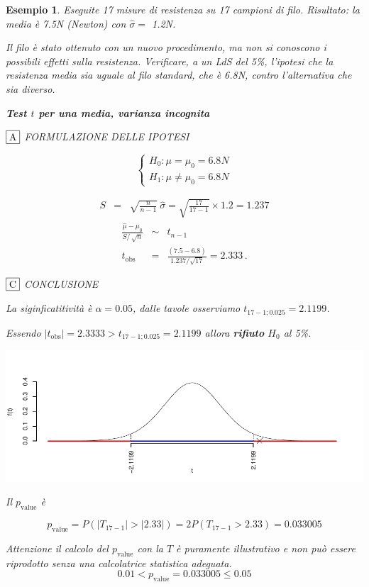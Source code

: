\documentclass[
  11pt,
]{book}
\theoremstyle{mytheoremstyle}
\theoremstyle{mydefstyle}
\newtheorem{example}{{Esempio}}[section]
\begin{document}
\begin{example}
Eseguite 17 misure di resistenza su 17 campioni di filo. Risultato: la
media è 7.5N (Newton) con \(\hat\sigma=\) 1.2N.

Il filo è stato ottenuto con un nuovo procedimento, ma non si conoscono
i possibili effetti sulla resistenza. Verificare, a un LdS del 5\%,
l'ipotesi che la resistenza media sia uguale al filo standard, che è
6.8N, contro l'alternativa che sia diverso.

\textbf{Test \(t\) per una media, varianza incognita}

\(\fbox{A}\) FORMULAZIONE DELLE IPOTESI

\[\begin{cases}
   H_0: \mu = \mu_0=6.8N \\
   H_1: \mu \neq \mu_0=6.8N 
   \end{cases}\]

\begin{eqnarray*}
   S    &=& \sqrt{\frac{n} {n-1}}\ \widehat{\sigma} 
   =  \sqrt{\frac{ 17 } { 17 -1}} \times  1.2  =  1.237 
   \end{eqnarray*}
\begin{eqnarray*}
   \frac{\hat\mu - \mu_{0}} {S/\,\sqrt{n}}&\sim&t_{n-1}\\
   t_{\text{obs}}
   &=& \frac{ ( 7.5 -  6.8 )} { 1.237 /\sqrt{ 17 }}
   =   2.333 \, .
   \end{eqnarray*}

\(\fbox{C}\) CONCLUSIONE

La siginficatitività è \(\alpha=0.05\), dalle tavole osserviamo \(t_{17-1;0.025}=2.1199\).

Essendo \(|t_\text{obs}|=2.3333>t_{17-1;0.025}=2.1199\) allora \textbf{rifiuto} \(H_0\) al 5\%.

\begin{center}\includegraphics{Appunti_di_Statistica_2025_files/figure-latex/15-test-mu-pi-7,-1} \end{center}

Il \(p_{\text{value}}\) è

\[ p_{\text{value}} = P(|T_{17-1}|>|2.33|)=2P(T_{17-1}>2.33)=0.033005 \]

Attenzione il calcolo del \(p_\text{value}\) con la \(T\) è puramente illustrativo e non può essere riprodotto senza una calcolatrice statistica adeguata.\[
 0.01 < p_\text{value}= 0.033005 \leq 0.05 
\]
\end{example}
\end{document}

